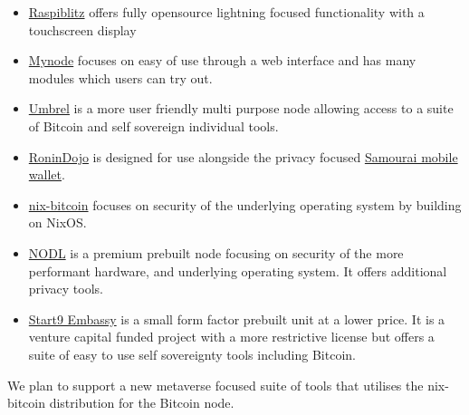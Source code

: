 \begin{itemize}
\item \href{https://github.com/rootzoll/raspiblitz}{Raspiblitz} offers fully opensource lightning focused functionality with a touchscreen display
\item \href{https://github.com/mynodebtc/mynode}{Mynode} focuses on easy of use through a web interface and has many modules which users can try out.
\item \href{https://github.com/getumbrel/umbrel-os}{Umbrel} is a more user friendly multi purpose node allowing access to a suite of Bitcoin and self sovereign individual tools.
\item \href{https://wiki.ronindojo.io/}{RoninDojo} is designed for use alongside the privacy focused \href{https://samouraiwallet.com/}{Samourai mobile wallet}.
\item \href{https://github.com/fort-nix/nix-bitcoin}{nix-bitcoin} focuses on security of the underlying operating system by building on NixOS.
\item \href{https://nodl.it}{NODL} is a premium prebuilt node focusing on security of the more performant hardware, and underlying operating system. It offers additional privacy tools.
\item \href{https://store.start9labs.com/collections/embassy}{Start9 Embassy} is a small form factor prebuilt unit at a lower price. It is a venture capital funded project with a more restrictive license but offers a suite of easy to use self sovereignty tools including Bitcoin. 
\end{itemize}
We plan to support a new metaverse focused suite of tools that utilises the nix-bitcoin distribution for the Bitcoin node.

